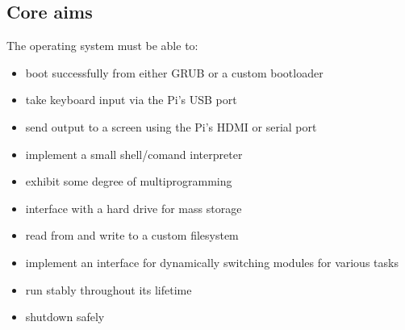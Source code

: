 \documentclass[10pt,a4paper]{article}
\begin{document}
%

\subsection{Core aims}
The operating system must be able to:
\begin{itemize}
    \item boot successfully from either GRUB or a custom bootloader
    \item take keyboard input via the Pi's USB port
    \item send output to a screen using the Pi's HDMI or serial port
    \item implement a small shell/comand interpreter
    \item exhibit some degree of multiprogramming
    \item interface with a hard drive for mass storage
    \item read from and write to a custom filesystem
    \item implement an interface for dynamically switching modules for various
        tasks
    \item run stably throughout its lifetime
    \item shutdown safely
\end{itemize}
\end{document}
